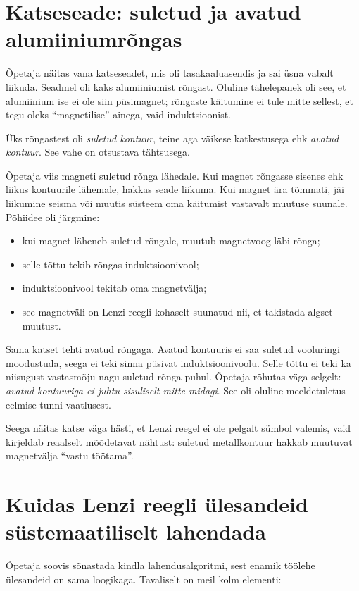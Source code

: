 \documentclass[a4paper,11pt]{article}
\begin{document}
\section{Katseseade: suletud ja avatud alumiiniumrõngas}

Õpetaja näitas vana katseseadet, mis oli tasakaaluasendis ja sai üsna vabalt liikuda. Seadmel oli kaks alumiiniumist rõngast. Oluline tähelepanek oli see, et alumiinium ise ei ole siin püsimagnet; rõngaste käitumine ei tule mitte sellest, et tegu oleks ``magnetilise'' ainega, vaid induktsioonist.

Üks rõngastest oli \emph{suletud kontuur}, teine aga väikese katkestusega ehk \emph{avatud kontuur}. See vahe on otsustava tähtsusega.

Õpetaja viis magneti suletud rõnga lähedale. Kui magnet rõngasse sisenes ehk liikus kontuurile lähemale, hakkas seade liikuma. Kui magnet ära tõmmati, jäi liikumine seisma või muutis süsteem oma käitumist vastavalt muutuse suunale. Põhiidee oli järgmine:

\begin{itemize}
    \item kui magnet läheneb suletud rõngale, muutub magnetvoog läbi rõnga;
    \item selle tõttu tekib rõngas induktsioonivool;
    \item induktsioonivool tekitab oma magnetvälja;
    \item see magnetväli on Lenzi reegli kohaselt suunatud nii, et takistada algset muutust.
\end{itemize}

Sama katset tehti avatud rõngaga. Avatud kontuuris ei saa suletud vooluringi moodustuda, seega ei teki sinna püsivat induktsioonivoolu. Selle tõttu ei teki ka niisugust vastasmõju nagu suletud rõnga puhul. Õpetaja rõhutas väga selgelt: \emph{avatud kontuuriga ei juhtu sisuliselt mitte midagi}. See oli oluline meeldetuletus eelmise tunni vaatlusest.

Seega näitas katse väga hästi, et Lenzi reegel ei ole pelgalt sümbol valemis, vaid kirjeldab reaalselt mõõdetavat nähtust: suletud metallkontuur hakkab muutuvat magnetvälja ``vastu töötama''.

\section{Kuidas Lenzi reegli ülesandeid süstemaatiliselt lahendada}

Õpetaja soovis sõnastada kindla lahendusalgoritmi, sest enamik töölehe ülesandeid on sama loogikaga. Tavaliselt on meil kolm elementi:
\end{document}
